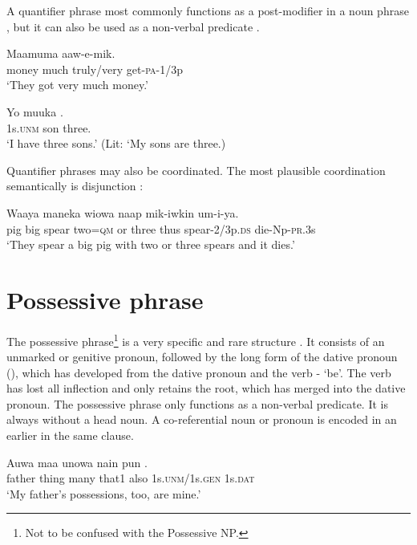 A quantifier phrase most commonly functions as a post-modifier in a noun phrase , but it can also be used as a non-verbal predicate .

\ea%
\label{ex:4:x846}
\gll Maamuma     aaw-e-mik. \\
   money  much  truly/very  get-\textsc{pa}-1/3p   \\
\glt`They got very much money.'
\z

\ea%
\label{ex:4:x843}
\gll Yo  muuka  . \\
  1s.\textsc{unm}  son  three.    \\
\glt`I have three sons.'  (Lit: `My sons are three.)
\z

Quantifier phrases may also be coordinated. The most plausible coordination semantically is disjunction : 

\ea%
\label{ex:4:x1360}
\gll Waaya  maneka  wiowa      naap  mik-iwkin um-i-ya.\\
    pig  big  spear  two=\textsc{qm}  or  three  thus  spear-2/3p.\textsc{ds} die-Np-\textsc{pr}.3s   \\
\glt`They spear a big pig with two or three spears and it dies.'
\z

\section{Possessive phrase} \label{sec:4.4}
{}
The possessive phrase\footnote{Not to be confused with the Possessive NP.} is a very specific and rare structure . It consists of an unmarked or genitive pronoun, followed by the long form of the dative pronoun (), which has developed from the dative pronoun and the verb - `be'. The verb has lost all inflection and only retains the root, which has merged into the dative pronoun. The possessive phrase only functions as a non-verbal predicate. It is always without a head noun. A co-referential noun or pronoun is encoded in an earlier  in the same clause.

\ea%
\label{ex:4:x847}
\gll Auwa  maa  unowa  nain  pun   . \\
   father  thing  many  that1  also  1s.\textsc{unm}/1s.\textsc{gen}  1s.\textsc{dat}   \\
\glt`My father's possessions, too, are mine.'
\z

